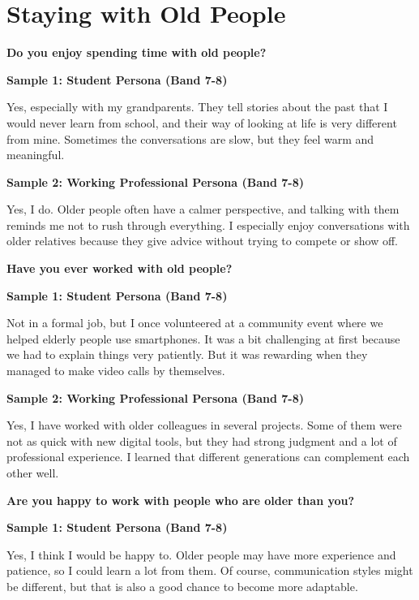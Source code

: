 \newpage

\section{Staying with Old People}
\begin{ieltsquestion}
\textbf{Do you enjoy spending time with old people?}
\end{ieltsquestion}
\textbf{Sample 1: Student Persona (Band 7-8)}

Yes, especially with my grandparents. They tell stories about the past that I would never learn from school, and their way of looking at life is very different from mine. Sometimes the conversations are slow, but they feel warm and meaningful.

\textbf{Sample 2: Working Professional Persona (Band 7-8)}

Yes, I do. Older people often have a calmer perspective, and talking with them reminds me not to rush through everything. I especially enjoy conversations with older relatives because they give advice without trying to compete or show off.

\separator

\begin{ieltsquestion}
\textbf{Have you ever worked with old people?}
\end{ieltsquestion}
\textbf{Sample 1: Student Persona (Band 7-8)}

Not in a formal job, but I once volunteered at a community event where we helped elderly people use smartphones. It was a bit challenging at first because we had to explain things very patiently. But it was rewarding when they managed to make video calls by themselves.

\textbf{Sample 2: Working Professional Persona (Band 7-8)}

Yes, I have worked with older colleagues in several projects. Some of them were not as quick with new digital tools, but they had strong judgment and a lot of professional experience. I learned that different generations can complement each other well.

\separator

\begin{ieltsquestion}
\textbf{Are you happy to work with people who are older than you?}
\end{ieltsquestion}
\textbf{Sample 1: Student Persona (Band 7-8)}

Yes, I think I would be happy to. Older people may have more experience and patience, so I could learn a lot from them. Of course, communication styles might be different, but that is also a good chance to become more adaptable.

